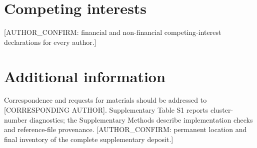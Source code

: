 \documentclass[11pt,a4paper]{article}
\begin{document}
\section*{Competing interests}
[AUTHOR\_CONFIRM: financial and non-financial competing-interest declarations for every author.]

\section*{Additional information}
Correspondence and requests for materials should be addressed to [CORRESPONDING AUTHOR]. Supplementary Table S1 reports cluster-number diagnostics; the Supplementary Methods describe implementation checks and reference-file provenance. [AUTHOR\_CONFIRM: permanent location and final inventory of the complete supplementary deposit.]
\end{document}
